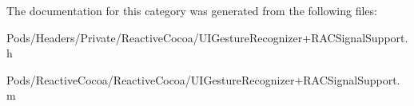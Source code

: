 The documentation for this category was generated from the following files\+:\begin{DoxyCompactItemize}
\item 
Pods/\+Headers/\+Private/\+Reactive\+Cocoa/U\+I\+Gesture\+Recognizer+\+R\+A\+C\+Signal\+Support.\+h\item 
Pods/\+Reactive\+Cocoa/\+Reactive\+Cocoa/U\+I\+Gesture\+Recognizer+\+R\+A\+C\+Signal\+Support.\+m\end{DoxyCompactItemize}
